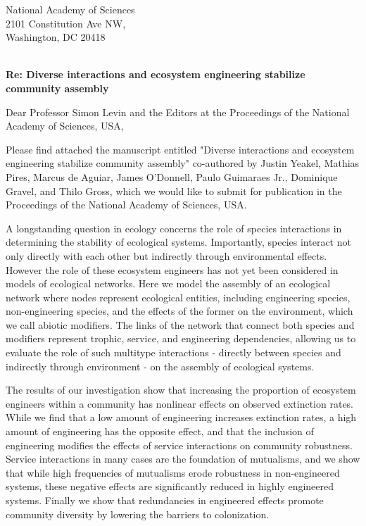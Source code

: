 \documentclass[ucm,12pt]{ucletter}
\begin{document}
\begin{letter}{
    National Academy of Sciences\\
    2101 Constitution Ave NW,\\
    Washington, DC 20418\\ \\
    \centerline{\bf{Re: Diverse interactions and ecosystem engineering stabilize community assembly}}
    \vspace{10mm}
}


\opening{Dear Professor Simon Levin and the Editors at the Proceedings of the National Academy of Sciences, USA,}


Please find attached the manuscript entitled "Diverse interactions and ecosystem engineering stabilize community assembly" co-authored by Justin Yeakel, Mathias Pires, Marcus de Aguiar, James O'Donnell, Paulo Guimaraes Jr., Dominique Gravel, and Thilo Gross, which we would like to submit for publication in the Proceedings of the National Academy of Sciences, USA. 

A longstanding question in ecology concerns the role of species interactions in determining the stability of ecological systems. Importantly, species interact not only directly with each other but indirectly through environmental effects. However the role of these ecosystem engineers has not yet been considered in models of ecological networks. Here we model the assembly of an ecological network where nodes represent ecological entities, including engineering species, non-engineering species, and the effects of the former on the environment, which we call abiotic modifiers. The links of the network that connect both species and modifiers represent trophic, service, and engineering dependencies, allowing us to evaluate the role of such multitype interactions - directly between species and indirectly through environment - on the assembly of ecological systems.

The results of our investigation show that increasing the proportion of ecosystem engineers within a community has nonlinear effects on observed extinction rates. While we find that a low amount of engineering increases extinction rates, a high amount of engineering has the opposite effect, and that the inclusion of engineering modifies the effects of service interactions on community robustness. Service interactions in many cases are the foundation of mutualisms, and we show that while high frequencies of mutualisms erode robustness in non-engineered systems, these negative effects are significantly reduced in highly engineered systems. Finally we show that redundancies in engineered effects promote community diversity by lowering the barriers to colonization. 


\end{letter}
\end{document}
